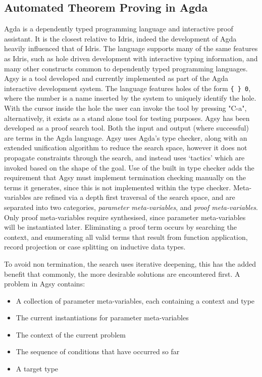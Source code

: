 \documentclass[a4paper]{article}
\begin{document}
\subsection{Automated Theorem Proving in Agda}
\label{sec:org9bbd902}
Agda is a dependently typed programming language and interactive proof 
assistant. It is the closest relative to Idris, indeed the development 
of Agda heavily influenced that of Idris\cite{Splv'202020Aug}. The language supports many
of the same features as Idris, such as hole driven development with 
interactive typing information, and many other constructs common to 
dependently typed programming languages. Agsy is a tool developed and 
currently implemented as part of the Agda interactive development system.
The language features holes of the form \texttt{\{ \} 0}, where the 
number is a name inserted by the system to uniquely identify the hole.
With the cursor inside the hole the user 
can invoke the tool by pressing "C-a", alternatively, it exists as a 
stand alone tool for testing purposes. Agsy has been developed as a proof search 
tool. Both the input and output (where successful) are terms in the Agda 
language. Agsy uses Agda's type checker, along with an extended 
unification algorithm to reduce the search space, however it does not 
propagate constraints through the search, and instead uses `tactics' 
which are invoked based on the shape of the goal. Use of the built in 
type checker adds the requirement that Agsy must implement termination
checking manually on the terms it generates, since this is not 
implemented within the type checker. Meta-variables are refined via a 
depth first traversal of the search space, and are separated into 
two categories, \emph{parameter meta-variables}, and \emph{proof meta-variables}.
Only proof meta-variables require synthesised, since parameter 
meta-variables will be instantiated later. Eliminating a proof term
occurs by searching the context, and enumerating all valid terms that 
result from function application, record projection or case splitting on
inductive data types.

To avoid non termination, the search uses iterative deepening, this has
the added benefit that commonly, the more desirable solutions are 
encountered first. A problem in Agsy contains:
\begin{itemize}
\item A collection of parameter meta-variables, each containing a context and type
\item The current instantiations for parameter meta-variables
\item The context of the current problem
\item The sequence of conditions that have occurred so far
\item A target type
\end{itemize}
\end{document}
